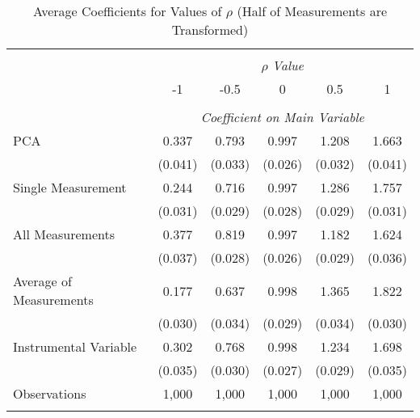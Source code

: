 \begin{table}[!htbp] \centering
  \caption{Average Coefficients for Values of $\rho$ (Half of Measurements are Transformed) \label{sim_rho_5_exp}}
\begin{tabular}{@{\extracolsep{5pt}}lccccc}
\\[-1.8ex]\hline
\hline \\[-1.8ex]
& \multicolumn{5}{c}{$\rho$ \textit{ Value}} \
\cr \
\\[-1.8ex] & -1 & -0.5 & 0 & 0.5 & 1 \\
\hline \\[-1.8ex]
& \multicolumn{5}{c}{\textit{Coefficient on Main Variable}} \\
PCA & 0.337 & 0.793 & 0.997 & 1.208 & 1.663  \\
& (0.041) & (0.033) & (0.026) & (0.032) & (0.041)\\
Single Measurement & 0.244 & 0.716 & 0.997 & 1.286 & 1.757  \\
& (0.031) & (0.029) & (0.028) & (0.029) & (0.031)\\
All Measurements & 0.377 & 0.819 & 0.997 & 1.182 & 1.624  \\
  & (0.037) & (0.028) & (0.026) & (0.029) & (0.036)\\
 Average of Measurements & 0.177 & 0.637 & 0.998 & 1.365 & 1.822  \\
  & (0.030) & (0.034) & (0.029) & (0.034) & (0.030)\\
  Instrumental Variable & 0.302 & 0.768 & 0.998 & 1.234 & 1.698 \\
  & (0.035) & (0.030) & (0.027) & (0.029) & (0.035) \\
 
 Observations & 1,000 & 1,000 & 1,000 & 1,000 & 1,000\\
\hline
\hline \\[-1.8ex]
\end{tabular}
\end{table}